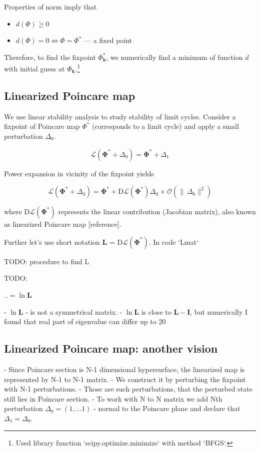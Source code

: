 \documentclass[a4paper,10pt]{article}
\renewcommand*{\vec}[1]{\mathbf{#1}}
\newcommand*{\D}{\Delta}%
\begin{document}
Properties of norm imply that
\begin{itemize}
\item $d(\Phi) \geq 0$
\item $d(\Phi)=0 \iff \Phi = \Phi^*$ --- a fixed point

\end{itemize}
Therefore, to find the fixpoint $\Phi^*_{\vec{k}}$, we numerically find a minimum of function $d$ with initial guess at $\Phi_{\vec{k}}$.\footnote{Used library function `scipy.optimize.minimize` with method `BFGS`.}


\subsection{ Linearized Poincare map}

We use linear stability analysis to study stability of limit cycles. Consider a fixpoint of Poincare map $\Phi^*$ (corresponds to a limit cycle) and apply a small perturbation $\D_0$.

$$\mathcal{L}(\mathbf{\Phi^{*}} + \D_0) = \mathbf{\Phi^{*}} + \D_1$$

Power expansion in vicinity of the fixpoint yields

$$\mathcal{L}(\mathbf{\Phi^{*}} + \D_0) = \mathbf{\Phi^{*}} +  \mathrm{D}\mathcal{L}(\mathbf{\Phi^*}) \D_0 + \mathcal{O}(\lVert\ \D_0 \rVert^2) $$

where $\mathrm{D}\mathcal{L}(\mathbf{\Phi^*})$ represents the linear contribution (Jacobian matrix), also known as linearized Poincare map [reference].

Further let's use short notation $\mathbf{L}$ = $\mathrm{D}\mathcal{L}(\mathbf{\Phi^*})$. In code `Lmat`

TODO: procedure to find L

TODO:

$.. = \ln \mathbf{L} $


- $\ln \mathbf{L}$ - is not a symmetrical matrix.
- $ \ln \mathbf{L}$ is close to $\mathbf{L} - \mathbf{I}$, but numerically I found that real part of eigenvalue can differ up to 20%

\subsection{Linearized Poincare map: another vision}

- Since Poincare section is N-1 dimensional hypersurface, the linearized map is represented by N-1 to N-1 matrix.
- We construct it by perturbing the fixpoint with N-1 perturbations.
  - Those are such perturbations, that the perturbed state still lies in Poincare section.
  - To work with N to N matrix we add Nth perturbation $\D_0 = (1,...1)$ - normal to the Poincare plane and declare that $\D_1 = \D_0$.
\end{document}
